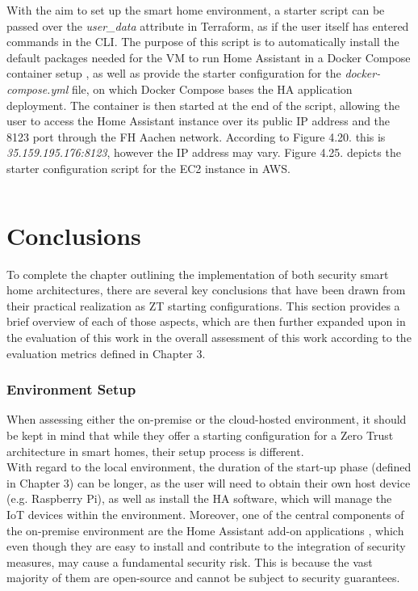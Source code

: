 With the aim to set up the smart home environment, a starter script can be passed over the \textit{user\_data} attribute in Terraform, as if the user itself has entered commands in the CLI. The purpose of this script is to automatically install the default packages needed for the VM to run Home Assistant in a Docker Compose container setup \cite{compose_install}, as well as provide the starter configuration for the \textit{docker-compose.yml} file, on which Docker Compose bases the HA application deployment. The container is then started at the end of the script, allowing the user to access the Home Assistant instance over its public IP address and the 8123 port through the FH Aachen network. According to Figure 4.20. this is \textit{35.159.195.176:8123}, however the IP address may vary. Figure 4.25. depicts the starter configuration script for the EC2 instance in AWS.

\begin{center}
  \label{fig:ec2setup}
\end{center}
\inputminted[breaklines, linenos]{bash}{Code/tf_config/ec2setup.sh}

\section{Conclusions}
To complete the chapter outlining the implementation of both security smart home architectures, there are several key conclusions that have been drawn from their practical realization as ZT starting configurations. This section provides a brief overview of each of those aspects, which are then further expanded upon in the evaluation of this work in the overall assessment of this work according to the evaluation metrics defined in Chapter 3.

\subsubsection{Environment Setup}
When assessing either the on-premise or the cloud-hosted environment, it should be kept in mind that while they offer a starting configuration for a Zero Trust architecture in smart homes, their setup process is different.\\

With regard to the local environment, the duration of the start-up phase (defined in Chapter 3) can be longer, as the user will need to obtain their own host device (e.g. Raspberry Pi), as well as install the HA software, which will manage the IoT devices within the environment. Moreover, one of the central components of the on-premise environment are the Home Assistant add-on applications \cite{ha_addons}, which even though they are easy to install and contribute to the integration of security measures, may cause a fundamental security risk. This is because the vast majority of them are open-source and cannot be subject to security guarantees.\\

